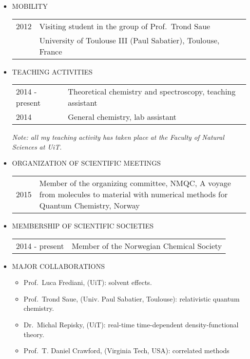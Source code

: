\documentclass[notitlepage,a4paper,12pt]{article}
\begin{document}
\begin{itemize}
\item MOBILITY

  \begin{tabular}{ll}
 2012 & Visiting student in the group of Prof.~Trond Saue \\
     &  University of Toulouse III (Paul Sabatier), Toulouse, France \\
  \end{tabular}

\item TEACHING ACTIVITIES

  \begin{tabular}{ll}
2014 - present  & Theoretical chemistry and spectroscopy, teaching assistant \\
2014  & General chemistry, lab assistant \\
  \end{tabular}

\emph{
  Note: all my teaching activity has taken place at the Faculty of Natural Sciences at UiT.}

\item ORGANIZATION OF SCIENTIFIC MEETINGS

  \begin{tabular}{lp{12cm}}
 2015 & Member of the organizing committee, NMQC, A voyage from molecules to material with numerical methods for Quantum Chemistry, Norway \\
  \end{tabular}

\item MEMBERSHIP OF SCIENTIFIC SOCIETIES

  \begin{tabular}{lp{12cm}}
2014 - present  & Member of the Norwegian Chemical Society \\
  \end{tabular}

\item MAJOR COLLABORATIONS

  \begin{itemize}
  \item Prof.~Luca Frediani, (UiT): solvent effects.
  \item Prof.~Trond Saue, (Univ. Paul Sabatier, Toulouse): relativistic quantum chemistry.
  \item Dr.~Michal Repisky, (UiT): real-time time-dependent density-functional theory.
  \item Prof.~T. Daniel Crawford, (Virginia Tech, USA): correlated methods
  \end{itemize}

\end{itemize}
\end{document}

